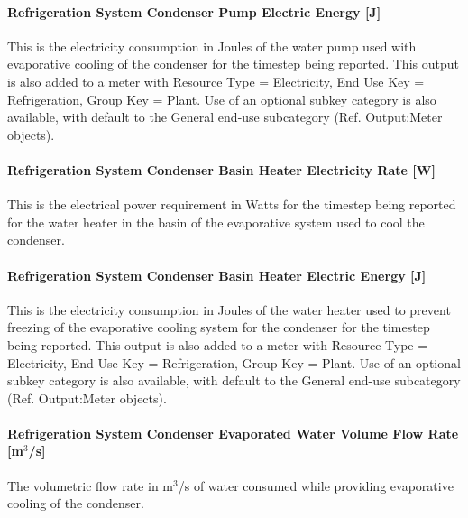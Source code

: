 \paragraph{Refrigeration System Condenser Pump Electric Energy {[}J{]}}\label{refrigeration-system-condenser-pump-electric-energy-j}

This is the electricity consumption in Joules of the water pump used with evaporative cooling of the condenser for the timestep being reported. This output is also added to a meter with Resource Type = Electricity, End Use Key = Refrigeration, Group Key = Plant. Use of an optional subkey category is also available, with default to the General end-use subcategory (Ref. Output:Meter objects).

\paragraph{Refrigeration System Condenser Basin Heater Electricity Rate {[}W{]}}\label{refrigeration-system-condenser-basin-heater-electric-power-w}

This is the electrical power requirement in Watts for the timestep being reported for the water heater in the basin of the evaporative system used to cool the condenser.

\paragraph{Refrigeration System Condenser Basin Heater Electric Energy {[}J{]}}\label{refrigeration-system-condenser-basin-heater-electric-energy-j}

This is the electricity consumption in Joules of the water heater used to prevent freezing of the evaporative cooling system for the condenser for the timestep being reported. This output is also added to a meter with Resource Type = Electricity, End Use Key = Refrigeration, Group Key = Plant. Use of an optional subkey category is also available, with default to the General end-use subcategory (Ref. Output:Meter objects).

\paragraph{Refrigeration System Condenser Evaporated Water Volume Flow Rate {[}m\(^{3}\)/s{]}}\label{refrigeration-system-condenser-evaporated-water-volume-flow-rate-m3s}

The volumetric flow rate in m\(^{3}\)/s of water consumed while providing evaporative cooling of the condenser.

